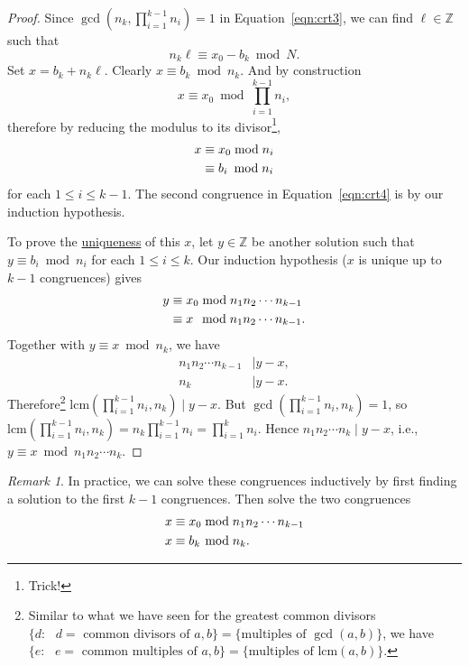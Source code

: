 \documentclass{amsbook}
\theoremstyle{plain}
\theoremstyle{definition}
\theoremstyle{remark}
\newtheorem{remark}[theorem]{Remark}
\numberwithin{equation}{chapter}
\numberwithin{figure}{chapter}
\newcommand{\Z}{\mathbb{Z}}
\begin{document}
\begin{proof}
    Since $\gcd (n_k, \prod_{i=1}^{k-1} n_i) = 1$ in Equation~\eqref{eqn:crt3}, we can find $\ell \in \Z$ such that 
\[
n_k \ell \equiv x_0 - b_k \bmod N.
\]
Set $x = b_k + n_k\ell$. Clearly $x \equiv b_k \bmod n_k$. And by construction 
\[
x \equiv x_0 \bmod \prod_{i=1}^{k-1}n_i,
\]
therefore by reducing the modulus to its divisor\footnote{Trick!},
\begin{align}
\begin{split}\label{eqn:crt4}
x &\equiv x_0 \bmod n_i \\
&\equiv b_i \hspace{.8mm}\bmod n_i
\end{split}
\end{align}
for each $1 \leqslant i \leqslant k-1$. The second congruence in Equation~\eqref{eqn:crt4} is by our induction hypothesis.

To prove the \underline{uni}q\underline{ueness} of this $x$, let $y \in \Z$ be another solution such that $y \equiv b_i \bmod n_i$ for each $1 \leqslant i \leqslant k$. Our induction hypothesis ($x$ is unique up to $k-1$ congruences) gives 
\begin{align}
  y &\equiv x_0 \bmod n_1n_2 \cdots n_{k-1} \\
    &\equiv x \hspace{1.5mm}\bmod n_1n_2 \cdots n_{k-1}.
\end{align}
Together with $y \equiv x \bmod n_k$, we have 
\begin{align}
n_1n_2 \cdots n_{k-1} &\mid y - x, \\
               n_k   &\mid y - x.
\end{align}
Therefore\footnote{Similar to what we have seen for the greatest common divisors $\{ \text{$d:$ $d =$ common divisors of $a, b$} \} = \{ \text{multiples of $\gcd (a, b)$} \}$, we have $\{ \text{$e:$ $e=$ common multiples of $a, b$} \} = \{ \text{multiples of $\text{lcm} (a, b)$} \}$.} $\text{lcm} (\prod_{i=1}^{k-1} n_i, n_k) \mid y - x$. But $\gcd (\prod_{i=1}^{k-1} n_i, n_k) = 1$, so $\text{lcm} (\prod_{i=1}^{k-1} n_i, n_k) = n_k \prod_{i=1}^{k-1} n_i = \prod_{i=1}^k n_i$. Hence $n_1n_2 \cdots n_k \mid y - x$, i.e., $y \equiv x \bmod n_1n_2 \cdots n_k$.
\end{proof}
\begin{remark}
In practice, we can solve these congruences inductively by first finding a solution to the first $k - 1$ congruences. Then solve the two congruences 
\begin{align}
  x &\equiv x_0 \bmod n_1n_2 \cdots n_{k-1} \\
  x &\equiv b_k \hspace{0.35mm}\bmod n_k.
\end{align}
\end{remark}
\end{document}
